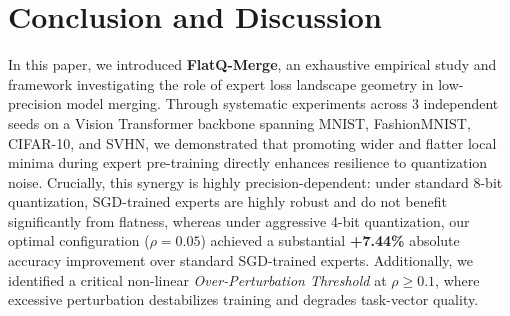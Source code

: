 \section{Conclusion and Discussion}
\label{sec:conclusion}

In this paper, we introduced \textbf{FlatQ-Merge}, an exhaustive empirical study and framework investigating the role of expert loss landscape geometry in low-precision model merging. Through systematic experiments across 3 independent seeds on a Vision Transformer backbone spanning MNIST, FashionMNIST, CIFAR-10, and SVHN, we demonstrated that promoting wider and flatter local minima during expert pre-training directly enhances resilience to quantization noise. Crucially, this synergy is highly precision-dependent: under standard 8-bit quantization, SGD-trained experts are highly robust and do not benefit significantly from flatness, whereas under aggressive 4-bit quantization, our optimal configuration ($\rho=0.05$) achieved a substantial \textbf{+7.44\%} absolute accuracy improvement over standard SGD-trained experts. Additionally, we identified a critical non-linear \emph{Over-Perturbation Threshold} at $\rho \ge 0.1$, where excessive perturbation destabilizes training and degrades task-vector quality.

